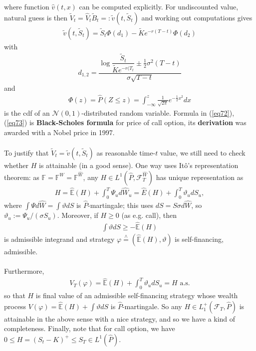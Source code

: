 \documentclass[12pt,a4paper, twoside]{article}
\theoremstyle{definition}
\newcommand{\EE}{\mathbb{E}} %
\newcommand{\teq}{\overset{\wedge}{=}}
\begin{document}
where function $\widehat{v}(t,x)$ can be computed explicitly. For undiscounted value, natural guess is then  $\widetilde{V}_t = \widehat{V}_t \widetilde{B}_t =: \widetilde{v}(t, \widetilde{S}_t)$ and working out computations gives 
\begin{align*} \label{eq72}
\widetilde{v}(t, \widetilde{S}_t) = \widetilde{S}_t \Phi(d_1) - \widetilde{K}e^{-r(T-t)} \Phi(d_2) \tag{7.2}
\end{align*}
with
\begin{align*} \label{eq73}
d_{1,2} = \dfrac{\log \dfrac{\widetilde{S}_t}{\widetilde{K}e^{-r(T_t}} \pm \frac{1}{2}\sigma^2(T-t)}{\sigma \sqrt{T-t}} \tag{7.3}
\end{align*}
and 
\begin{align*}
\Phi(z) = \widehat{P}( Z \leq z ) = \int_{- \infty}^z \frac{1}{\sqrt{2 \pi}}e^{- \frac{1}{2}x^2}dx
\end{align*}
is the cdf of an $\mathcal{N}(0,1)$-distributed random variable. Formula in (\ref{eq72}), (\ref{eq73}) is \textbf{Black-Scholes formula} for price of call option, its \textbf{derivation} was awarded with a Nobel price in 1997. 
\\\\
To justify that $\widetilde{V}_t= \widetilde{v}(t, \widetilde{S}_t)$ as reasonable time-$t$ value, we still need to check whether $H$ is attainable (in a good sense). 
\newpage
One way uses Itô's representation theorem: as $\mathbb{F}= \mathbb{F}^W = \mathbb{F}^{\widehat{W}}$, any $H \in L^1( \widehat{P}, \mathcal{F}_T^{\widehat{W}})$ has unique representation as 
\begin{align*}
H = \widehat{\EE}(H) + \int_0^T \Psi_u d \widehat{W}_u = \widehat{E}(H) + \int_0^T \vartheta_u d S_u,
\end{align*}
where $\int \Psi d \widehat{W} = \int \vartheta dS$ is $\widehat{P}$-martingale; this uses $dS= S \sigma d \widehat{W}$, so $\vartheta_u := \Psi_u/ (\sigma S_u)$. Moreover, if $H \geq 0$ (as e.g. call), then 
\begin{align*}
\int \vartheta dS \geq - \widehat{\EE}(H)
\end{align*}
is admissible integrand and strategy $\varphi \teq ( \widehat{\EE}(H), \vartheta)$ is self-financing, admissible. \\
\\
Furthermore, \begin{align*}
V_T( \varphi)= \widehat{\EE}(H) + \int_0^T \vartheta_u dS_u = H \text{ a.s.}
\end{align*}
so that $H$ is final value of an admissible self-financing strategy whose wealth process $V( \varphi) = \widehat{\EE}(H) + \int \vartheta dS$ is $\widehat{P}$-martingale. So any $H \in L_1^+( \mathcal{F}_T, \widehat{P})$ is attainable in the above sense with a nice strategy, and so we have a kind of completeness. Finally,  note that for call option, we have $0 \leq H = (S_t-K)^+ \leq S_T \in L^1( \widehat{P})$. \\
\end{document}

